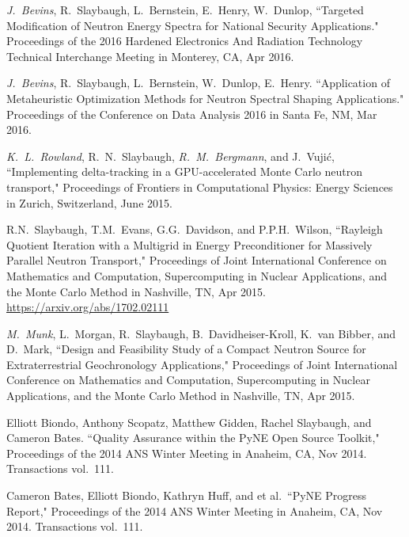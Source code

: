 \begin{bibsection}
\item \textit{J.\ Bevins}, R.\ Slaybaugh, L.\ Bernstein, E.\ Henry, W.\ Dunlop, ``Targeted Modification of Neutron Energy Spectra for National Security Applications." Proceedings of the 2016 Hardened Electronics And Radiation Technology Technical Interchange Meeting in Monterey, CA, Apr 2016. 

\item \textit{J.\ Bevins}, R.\ Slaybaugh, L.\ Bernstein, W.\ Dunlop, E.\ Henry. ``Application of Metaheuristic Optimization Methods for Neutron Spectral Shaping Applications." Proceedings of the Conference on Data Analysis 2016 in Santa Fe, NM, Mar 2016. 

\item \textit{K.\ L.\ Rowland}, R.\ N.\ Slaybaugh, \textit{R.\ M.\ Bergmann}, and J.\ Vuji\'c, ``Implementing delta-tracking in a GPU-accelerated Monte Carlo neutron transport," Proceedings of Frontiers in Computational Physics: Energy Sciences in Zurich, Switzerland, June 2015. 

\item  R.N.\ Slaybaugh, T.M.\ Evans, G.G.\ Davidson, and P.P.H.\ Wilson, ``Rayleigh Quotient Iteration with a Multigrid in Energy Preconditioner for Massively Parallel Neutron Transport," Proceedings of Joint International Conference on Mathematics and Computation, Supercomputing in Nuclear Applications, and the Monte Carlo Method in Nashville, TN, Apr 2015.\\
\url{https://arxiv.org/abs/1702.02111}

\item  \textit{M.\ Munk}, L.\ Morgan, R.\ Slaybaugh, B.\ Davidheiser-Kroll, K.\ van Bibber, and D.\ Mark, ``Design and Feasibility Study of a Compact Neutron Source for Extraterrestrial Geochronology Applications," Proceedings of Joint International Conference on Mathematics and Computation, Supercomputing in Nuclear Applications, and the Monte Carlo Method in Nashville, TN, Apr 2015.

\item Elliott Biondo, Anthony Scopatz, Matthew Gidden, Rachel Slaybaugh, and Cameron Bates. ``Quality Assurance within the PyNE Open Source Toolkit,"  Proceedings of the 2014 ANS Winter Meeting in Anaheim, CA, Nov 2014. Transactions vol.\ 111.

\item Cameron Bates, Elliott Biondo, Kathryn Huff, and et al.\ ``PyNE Progress Report," Proceedings of the 2014 ANS Winter Meeting in Anaheim, CA, Nov 2014. Transactions vol.\ 111.


\end{bibsection}
